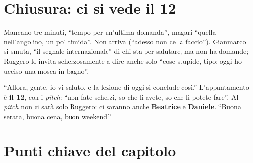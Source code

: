 \section{Chiusura: ci si vede il 12}
\label{a10:sec:chiusura}

Mancano tre minuti, ``tempo per un'ultima domanda'', magari ``quella nell'angolino, un
po' timida''. Non arriva (``adesso non ce la faccio''). Gianmarco si smuta, ``il segnale
internazionale'' di chi sta per salutare, ma non ha domande; Ruggero lo invita
scherzosamente a dire anche solo ``cose stupide, tipo: oggi ho ucciso una mosca in
bagno''.

``Allora, gente, io vi saluto, e la lezione di oggi si conclude così.'' L'appuntamento è
\textbf{il 12}, con i \emph{pitch}: ``non fate scherzi, so che li avete, so che li potete
fare''. Al \emph{pitch} non ci sarà solo Ruggero: ci saranno anche \textbf{Beatrice} e
\textbf{Daniele}. ``Buona serata, buona cena, buon weekend.''

\section*{Punti chiave del capitolo}

